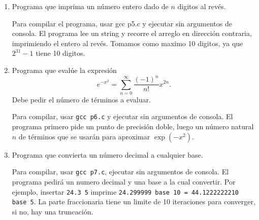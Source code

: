 \documentclass{article}
\begin{document}
\begin{enumerate}
\begin{mdframed}[
			linecolor=darkgray,
			backgroundcolor=pearl]
		\end{mdframed}
		
		
		\vspace{12pt}
		
		
		\item
		Programa que imprima un n\'umero entero dado de $n$ digitos al rev\'es.
		\vspace{12pt}
		\begin{mdframed}[
			linecolor=darkgray,
			backgroundcolor=pearl]
			
			Para compilar el programa, usar gcc p5.c y ejecutar sin argumentos de consola. El programa lee un string y recorre el arreglo en direcci\'on contraria, imprimiendo el entero al rev\'es. Tomamos como maximo 10 digitos, ya que $2^31-1$ tiene 10 digitos.
			
			
		\end{mdframed}
		
		
		\item Programa que eval\'ue la expresi\'on
		\[ 
			e^{-x^2} = \sum_{n=0}^{\infty} \frac{(-1)^n}{n!}x^{2n}.		
		\] 
		Debe pedir el n\'umero de t\'erminos a evaluar.
		
		\begin{mdframed}[
			linecolor=darkgray,
			backgroundcolor=pearl]
			Para compilar, usar \texttt{gcc p6.c} y ejecutar sin argumentos de consola. El programa primero pide un punto de precisi\'on doble, luego un n\'umero natural $n$ de t\'erminos que se usar\'an para aproximar $\exp(-x^2)$.
			
		\end{mdframed}
		
		\vspace{12pt}
		
		
		
		\item Programa que convierta un n\'umero decimal a cualquier base.
		\begin{mdframed}[
			linecolor=darkgray,
			backgroundcolor=pearl]
			Para compilar, usar \texttt{gcc p7.c}, ejecutar sin argumentos de consola. El programa pedir\'a un numero decimal y una base a la cual convertir. Por ejemplo, insertar \texttt{24.3 5} imprime
			\texttt{24.299999 base 10 = 44.1222222210 base 5}. La parte fraccionaria tiene un limite de 10 iteraciones para converger, si no, hay una truncaci\'on.
			
			
		\end{mdframed}
		

\end{enumerate}
\end{document}
